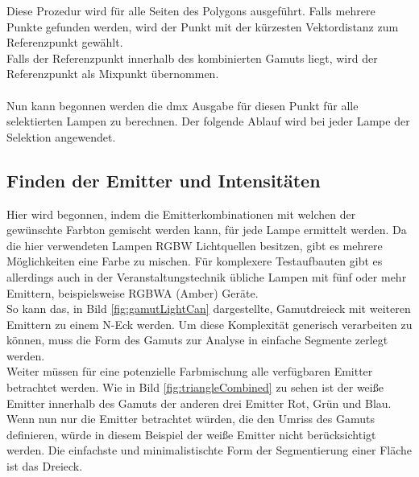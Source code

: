 \documentclass[11pt]{scrartcl}
\begin{document}
Diese Prozedur wird für alle Seiten des Polygons ausgeführt. Falls mehrere Punkte gefunden werden, wird der Punkt mit der kürzesten Vektordistanz zum
Referenzpunkt gewählt.\\
Falls der Referenzpunkt innerhalb des kombinierten Gamuts liegt, wird der Referenzpunkt als Mixpunkt übernommen.\\
\\
Nun kann begonnen werden die \ac{dmx} Ausgabe für diesen Punkt für alle selektierten Lampen zu berechnen. Der folgende Ablauf wird bei jeder Lampe der Selektion
angewendet.
\subsection{Finden der Emitter und Intensitäten}
Hier wird begonnen, indem die Emitterkombinationen mit welchen der gewünschte Farbton gemischt werden kann, für jede Lampe ermittelt werden. Da die hier
verwendeten Lampen RGBW Lichtquellen besitzen, gibt es mehrere Möglichkeiten eine Farbe zu mischen. Für komplexere Testaufbauten gibt es allerdings auch in der
Veranstaltungstechnik übliche Lampen mit fünf oder mehr Emittern, beispielsweise RGBWA (Amber) Geräte.\\
So kann das, in Bild \ref{fig:gamutLightCan} dargestellte, Gamutdreieck mit weiteren Emittern zu einem N-Eck werden. Um diese Komplexität generisch
verarbeiten zu können, muss die Form des Gamuts zur Analyse in einfache Segmente zerlegt werden.\\
Weiter müssen für eine potenzielle Farbmischung alle verfügbaren Emitter betrachtet werden. Wie in Bild \ref{fig:triangleCombined} zu sehen ist der weiße
Emitter innerhalb des Gamuts der anderen drei Emitter Rot, Grün und Blau. Wenn nun nur die Emitter betrachtet würden, die den Umriss des Gamuts
definieren, würde in diesem Beispiel der weiße Emitter nicht berücksichtigt werden. Die einfachste und minimalistischte Form der Segmentierung
einer Fläche ist das Dreieck.
\end{document}
